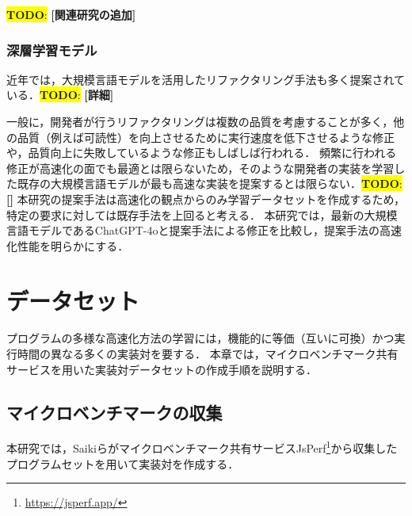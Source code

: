 \documentclass[11pt]{jreport}
\newcommand{\todo}[1]{\colorbox{yellow}{{\bf TODO}:}{\color{red} {\textbf{[#1]}}}}
\begin{document}
\todo{関連研究の追加}




\subsection{深層学習モデル}


近年では，大規模言語モデルを活用したリファクタリング手法も多く提案されている\cite{Ishizue_2024}\cite{Shirafuji_2023}．\todo{詳細}

一般に，開発者が行うリファクタリングは複数の品質を考慮することが多く，他の品質（例えば可読性）を向上させるために実行速度を低下させるような修正や，品質向上に失敗しているような修正もしばしば行われる．
頻繁に行われる修正が高速化の面でも最適とは限らないため，そのような開発者の実装を学習した既存の大規模言語モデルが最も高速な実装を提案するとは限らない．\todo{}
本研究の提案手法は高速化の観点からのみ学習データセットを作成するため，特定の要求に対しては既存手法を上回ると考える．
本研究では，最新の大規模言語モデルであるChatGPT-4oと提案手法による修正を比較し，提案手法の高速化性能を明らかにする．




\chapter{データセット}\label{chapter:dataset}


プログラムの多様な高速化方法の学習には，機能的に等価（互いに可換）かつ実行時間の異なる多くの実装対を要する．
本章では，マイクロベンチマーク共有サービスを用いた実装対データセットの作成手順を説明する．




\section{マイクロベンチマークの収集}\label{chapter:dataset:collect}


本研究では，Saikiら\cite{Saiki_2021}がマイクロベンチマーク共有サービスJsPerf\footnote{\url{https://jsperf.app/}}から収集したプログラムセットを用いて実装対を作成する．
\end{document}
